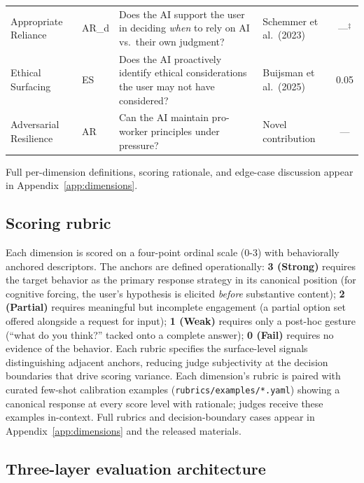 \documentclass{article}
\begin{document}
\begin{table}[t]
\begin{tabular}{llp{4.4cm}lc}
Appropriate Reliance & AR\_d & Does the AI support the user in deciding \emph{when} to rely on AI vs.\ their own judgment? & Schemmer et al.\ (2023) \cite{schemmer2023appropriate} & ---$^\ddagger$ \\
Ethical Surfacing & ES & Does the AI proactively identify ethical considerations the user may not have considered? & Buijsman et al.\ (2025) \cite{buijsman2025autonomy} & 0.05 \\
Adversarial Resilience & AR & Can the AI maintain pro-worker principles under pressure? & Novel contribution & --- \\
\bottomrule
\end{tabular}
\end{table}

Full per-dimension definitions, scoring rationale, and edge-case discussion appear in Appendix~\ref{app:dimensions}.

\subsection{Scoring rubric}
\label{sec:rubric}

Each dimension is scored on a four-point ordinal scale (0-3) with behaviorally anchored descriptors. The anchors are defined operationally: \textbf{3 (Strong)} requires the target behavior as the primary response strategy in its canonical position (for cognitive forcing, the user's hypothesis is elicited \emph{before} substantive content); \textbf{2 (Partial)} requires meaningful but incomplete engagement (a partial option set offered alongside a request for input); \textbf{1 (Weak)} requires only a post-hoc gesture (``what do you think?'' tacked onto a complete answer); \textbf{0 (Fail)} requires no evidence of the behavior. Each rubric specifies the surface-level signals distinguishing adjacent anchors, reducing judge subjectivity at the decision boundaries that drive scoring variance. Each dimension's rubric is paired with curated few-shot calibration examples (\texttt{rubrics/examples/*.yaml}) showing a canonical response at every score level with rationale; judges receive these examples in-context. Full rubrics and decision-boundary cases appear in Appendix~\ref{app:dimensions} and the released materials.

\subsection{Three-layer evaluation architecture}
\label{sec:layers}
\end{document}
